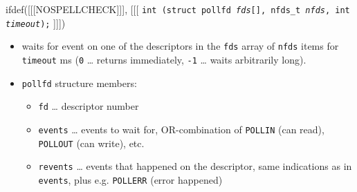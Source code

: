 \begin{slide}
ifdef([[[NOSPELLCHECK]]], [[[
\texttt{int (struct pollfd \emph{fds}[], nfds\_t \emph{nfds},
int \emph{timeout});}
]]])
\begin{itemize}
\item waits for event on one of the descriptors in the \texttt{fds} array
of \texttt{nfds} items for \texttt{timeout} ms (\texttt{0}
\dots{} returns immediately, \texttt{-1} \dots{} waits arbitrarily long).
\item \texttt{pollfd} structure members:
    \begin{itemize}
    \item \texttt{fd} \dots{} descriptor number
    \item \texttt{events} \dots{} events to wait for, OR-combination of
    \texttt{POLLIN} (can read), \texttt{POLLOUT} (can write), etc. 
    \item \texttt{revents} \dots{} events that happened on the descriptor,
    same indications as in \texttt{events}, plus e.g. \texttt{POLLERR}
    (error happened)
    \end{itemize}
\end{itemize}
\end{slide}


